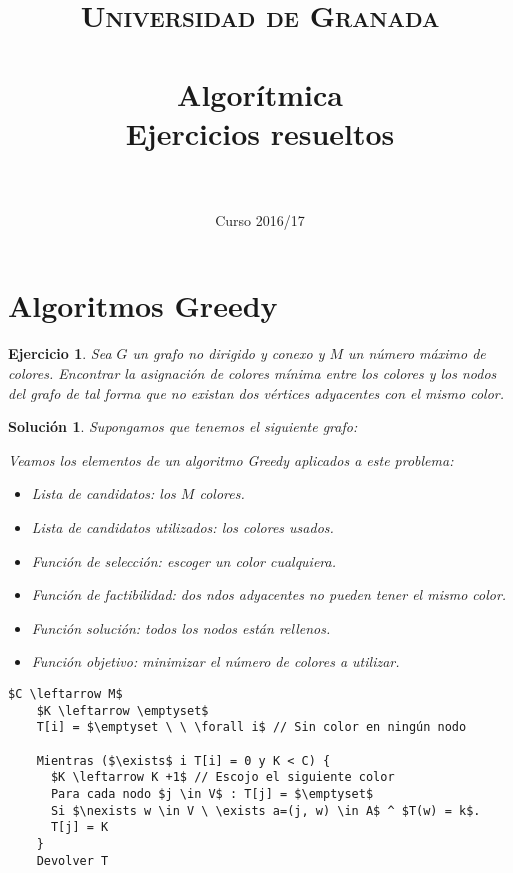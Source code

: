 \documentclass[11pt, a4paper]{article}
\title{
  \normalfont \normalsize 
  \textsc{Universidad de Granada} \\ [25pt]    %
  \horrule{0.5pt} \\[0.4cm] %
  \sffamily\huge Algorítmica\\ \Large{Ejercicios resueltos}\\ %
  \horrule{2pt} \\[0.5cm] %
}
\author{\Large\sffamily{\docauthor}}
\date{\vspace{-1.5em} \normalsize \sffamily Curso 2016/17}
\newif\IfInSansMode
\theoremstyle{theorem-style}
\theoremstyle{definition-style}
\newtheorem{ejer}{Ejercicio}[section]
\theoremstyle{remark-style}
\newtheorem*{sol}{Solución}
\theoremstyle{example-style}
\begin{document}
\maketitle  %
\vfill
\newpage
\tableofcontents    %
\newpage

\section{Algoritmos Greedy}


\begin{ejer}
  Sea $G$ un grafo no dirigido y conexo y $M$ un número máximo de
  colores. Encontrar la asignación de colores mínima entre los colores y los
  nodos del grafo de tal forma que no existan dos vértices adyacentes con el mismo color.
\end{ejer}

\begin{sol}
  Supongamos que tenemos el siguiente grafo:


  Veamos los elementos de un algoritmo Greedy aplicados a este problema:

  \begin{itemize}
  \item Lista de candidatos: los $M$ colores.
  \item Lista de candidatos utilizados: los colores usados.
  \item Función de selección: escoger un color cualquiera.
  \item Función de factibilidad: dos ndos adyacentes no pueden tener el mismo
    color.
  \item Función solución: todos los nodos están rellenos.
  \item Función objetivo: minimizar el número de colores a utilizar.
  \end{itemize}

  \begin{lstlisting}[mathescape=true]
    $C \leftarrow M$
    $K \leftarrow \emptyset$
    T[i] = $\emptyset \ \ \forall i$ // Sin color en ningún nodo

    Mientras ($\exists$ i T[i] = 0 y K < C) {
      $K \leftarrow K +1$ // Escojo el siguiente color
      Para cada nodo $j \in V$ : T[j] = $\emptyset$
      Si $\nexists w \in V \ \exists a=(j, w) \in A$ ^ $T(w) = k$.
      T[j] = K
    }
    Devolver T
  \end{lstlisting}
\end{sol}
\end{document}
